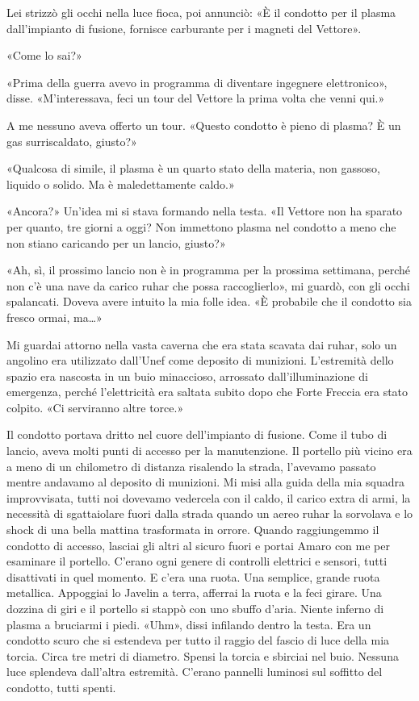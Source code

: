 Lei strizzò gli occhi nella luce fioca, poi annunciò: «È il condotto per
il plasma dall'impianto di fusione, fornisce carburante per i magneti
del Vettore».

«Come lo sai?»

«Prima della guerra avevo in programma di diventare ingegnere
elettronico», disse. «M'interessava, feci un tour del Vettore la prima
volta che venni qui.»

A me nessuno aveva offerto un tour. «Questo condotto è pieno di plasma?
È un gas surriscaldato, giusto?»

«Qualcosa di simile, il plasma è un quarto stato della materia, non
gassoso, liquido o solido. Ma è maledettamente caldo.»

«Ancora?» Un'idea mi si stava formando nella testa. «Il Vettore non ha
sparato per quanto, tre giorni a oggi? Non immettono plasma nel condotto
a meno che non stiano caricando per un lancio, giusto?»

«Ah, sì, il prossimo lancio non è in programma per la prossima
settimana, perché non c'è una nave da carico ruhar che possa
raccoglierlo», mi guardò, con gli occhi spalancati. Doveva avere intuito
la mia folle idea. «È probabile che il condotto sia fresco ormai,
ma\ldots»

Mi guardai attorno nella vasta caverna che era stata scavata dai ruhar,
solo un angolino era utilizzato dall'Unef come deposito di munizioni.
L'estremità dello spazio era nascosta in un buio minaccioso, arrossato
dall'illuminazione di emergenza, perché l'elettricità era saltata subito
dopo che Forte Freccia era stato colpito. «Ci serviranno altre torce.»

Il condotto portava dritto nel cuore dell'impianto di fusione. Come il
tubo di lancio, aveva molti punti di accesso per la manutenzione. Il
portello più vicino era a meno di un chilometro di distanza risalendo la
strada, l'avevamo passato mentre andavamo al deposito di munizioni. Mi
misi alla guida della mia squadra improvvisata, tutti noi dovevamo
vedercela con il caldo, il carico extra di armi, la necessità di
sgattaiolare fuori dalla strada quando un aereo ruhar la sorvolava e lo
shock di una bella mattina trasformata in orrore. Quando raggiungemmo il
condotto di accesso, lasciai gli altri al sicuro fuori e portai Amaro
con me per esaminare il portello. C'erano ogni genere di controlli
elettrici e sensori, tutti disattivati in quel momento. E c'era una
ruota. Una semplice, grande ruota metallica. Appoggiai lo Javelin a
terra, afferrai la ruota e la feci girare. Una dozzina di giri e il
portello si stappò con uno sbuffo d'aria. Niente inferno di plasma a
bruciarmi i piedi. «Uhm», dissi infilando dentro la testa. Era un
condotto scuro che si estendeva per tutto il raggio del fascio di luce
della mia torcia. Circa tre metri di diametro. Spensi la torcia e
sbirciai nel buio. Nessuna luce splendeva dall'altra estremità. C'erano
pannelli luminosi sul soffitto del condotto, tutti spenti.

